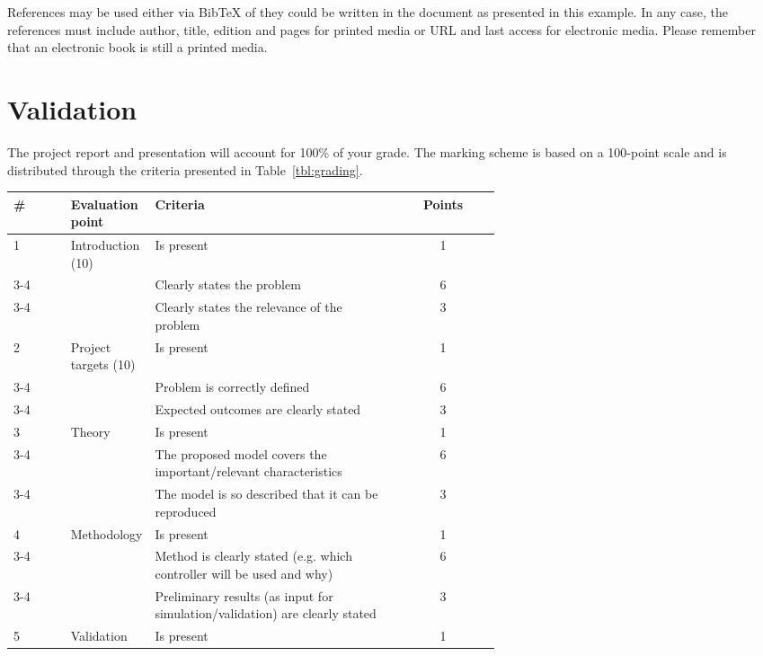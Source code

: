 	References may be used either via BibTeX of they could be written in the document as presented in this example. In any case, the references must include author, title, edition and pages for printed media or URL and last access for electronic media. Please remember that an electronic book is still a printed media.
	
	\section{Validation}
	
	The project report and presentation will account for 100\% of your grade. The marking scheme is based on a 100-point scale and is distributed through the criteria presented in Table~\ref{tbl:grading}.
	
	\begin{table*}[h]
		\caption{Grading scheme for projects in SoSe 2020}\label{tbl:grading}
		\centering
		\begin{tabular}{l p{0.13\linewidth} p{0.5\linewidth} c}
			\hline
			\bfseries \# & \bfseries Evaluation point & \bfseries Criteria & \bfseries Points \\
			\hline
			1 & Introduction (10) & Is present & 1 \\
			\cline{3-4}
			 & & Clearly states the problem & 6 \\
			 \cline{3-4}
			 & & Clearly states the relevance of the problem & 3\\
			 \hline
			 2 & Project targets (10) & Is present & 1 \\
			 \cline{3-4}
			 & & Problem is correctly defined & 6 \\
			\cline{3-4}
			 & & Expected outcomes are clearly stated & 3 \\
			 \hline
			 3 & Theory & Is present & 1 \\
			\cline{3-4}
			 & & The proposed model covers the important/relevant characteristics & 6 \\
			\cline{3-4}
			 & & The model is so described that it can be reproduced & 3\\
			 \hline
			 4 & Methodology & Is present & 1 \\
			\cline{3-4}
			 & & Method is clearly stated (e.g. which controller will be used and why) & 6 \\
			\cline{3-4}
			 & & Preliminary results (as input for simulation/validation) are clearly stated & 3\\
			 \hline
			 5 & Validation & Is present & 1 \\

\end{tabular}
\end{table*}
